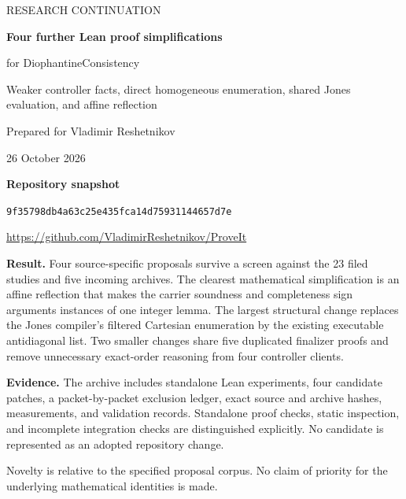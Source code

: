 \documentclass[11pt,letterpaper]{article}
\newcommand{\repo}{\url{https://github.com/VladimirReshetnikov/ProveIt}}
\newcommand{\pin}{\texttt{9f35798db4a63c25e435fca14d75931144657d7e}}
\begin{document}
\begin{titlepage}
\vspace*{0.4in}
{\sffamily\color{blue}\large RESEARCH CONTINUATION\par}
\vspace{0.25in}
{\sffamily\bfseries\color{ink}\LARGE Four further Lean proof simplifications\par}
\vspace{0.12in}
{\sffamily\Large for DiophantineConsistency\par}
\vspace{0.35in}
{\large Weaker controller facts, direct homogeneous enumeration, shared Jones evaluation, and affine reflection\par}
\vspace{0.35in}
{\large Prepared for Vladimir Reshetnikov\par}
{26 October 2026\par}
\vspace{0.35in}
\textbf{Repository snapshot}\par
\pin\par
\repo\par
\vspace{0.3in}
\begin{minipage}{0.96\textwidth}
\textbf{Result.} Four source-specific proposals survive a screen against the 23 filed studies and five incoming archives. The clearest mathematical simplification is an affine reflection that makes the carrier soundness and completeness sign arguments instances of one integer lemma. The largest structural change replaces the Jones compiler's filtered Cartesian enumeration by the existing executable antidiagonal list. Two smaller changes share five duplicated finalizer proofs and remove unnecessary exact-order reasoning from four controller clients.

\textbf{Evidence.} The archive includes standalone Lean experiments, four candidate patches, a packet-by-packet exclusion ledger, exact source and archive hashes, measurements, and validation records. Standalone proof checks, static inspection, and incomplete integration checks are distinguished explicitly. No candidate is represented as an adopted repository change.
\end{minipage}
\vfill
{\small\sffamily Novelty is relative to the specified proposal corpus. No claim of priority for the underlying mathematical identities is made.}
\end{titlepage}
{\small\setlength{\parskip}{0pt}\tableofcontents}
\newpage
\end{document}
